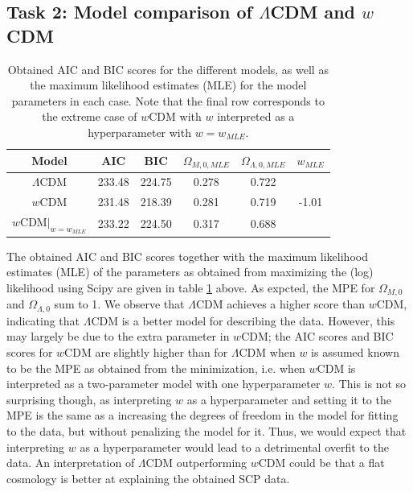 \documentclass[11pt,a4paper]{article}
\begin{document}
\subsection[Task 2]{Task 2: Model comparison of $\Lambda$CDM and $w$CDM}

\begin{table}[H]
    \centering
    \caption{Obtained AIC and BIC scores for the different models, as well as the maximum likelihood estimates (MLE) for the model parameters in each case. Note that the final row corresponds to the extreme case of $w$CDM with $w$ interpreted as a hyperparameter with $w=w_{MLE}$.}
    \begin{tabular}{||c c c c c c||} 
         \hline
         Model & AIC & BIC & $\Omega_{M,0, MLE}$ & $\Omega_{\Lambda, 0, MLE}$ & $w_{MLE}$\\ [0.5ex] 
         \hline\hline
         $\Lambda$CDM & 233.48 & 224.75 &   0.278 & 0.722 &  \\
         \hline
         $w$CDM & 231.48 & 218.39 & 0.281 &  0.719 &-1.01 \\
         \hline
         $\left. w\text{CDM} \right\rvert_{w=w_{MLE}}$  & 233.22 & 224.50 & 0.317 & 0.688 & \\ [1ex]
         \hline
    \end{tabular}
    \label{tab:AIC_BIC}
\end{table}


The obtained AIC and BIC scores together with the maximum likelihood estimates (MLE) of the parameters as obtained from maximizing the (log) likelihood using Scipy are given in table \ref{tab:AIC_BIC} above. As expcted, the MPE for $\Omega_{M,0}$ and $\Omega_{\Lambda,0}$ sum to 1. We observe that $\Lambda$CDM achieves a higher score than $w$CDM, indicating that $\Lambda$CDM is a better model for describing the data. However, this may largely be due to the extra parameter in $w$CDM; the AIC scores and BIC scores for $w$CDM are slightly higher than for $\Lambda$CDM when $w$ is assumed known to be the MPE as obtained from the minimization, i.e. when $w$CDM is interpreted as a two-parameter model with one hyperparameter $w$. This is not so surprising though, as interpreting $w$ as a hyperparameter and setting it to the MPE is the same as a increasing the degrees of freedom in the model for fitting to the data, but without penalizing the model for it. Thus, we would expect that interpreting $w$ as a hyperparameter would lead to a detrimental overfit to the data. An interpretation of $\Lambda$CDM outperforming $w$CDM could be that a flat cosmology is better at explaining the obtained SCP data.
\end{document}
